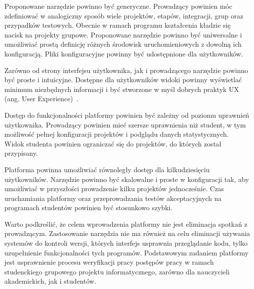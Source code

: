 Proponowane narzędzie powinno być generyczne.
Prowadzący powinien móc zdefiniować w analogiczny sposób wiele projektów, etapów, integracji, grup oraz przypadków testowych.
Obecnie w ramach programu kształcenia kładzie się nacisk na projekty grupowe.
Proponowane narzędzie powinno być uniwersalne i umożliwiać prostą definicję różnych środowisk uruchomieniowych z dowolną ich konfiguracją.
Pliki konfiguracyjne powinny być udostępnione dla użytkowników.

Zarówno od strony interfejsu użytkownika, jak i prowadzącego narzędzie powinno być proste i intuicyjne.
Dostępne dla użytkowników widoki powinny wyświetlać minimum niezbędnych informacji i być stworzone w myśl dobrych praktyk UX (ang. User Experience)~\cite{ux-good-practicies}.

Dostęp do funkcjonalności platformy powinien być zależny od poziomu uprawnień użytkownika.
Prowadzący powinien mieć szersze uprawnienia niż student, w tym możliwość pełnej konfiguracji projektów i podglądu danych statystycznych.
Widok studenta powinien ograniczać się do projektów, do których został przypisany.

Platforma powinna umożliwiać równoległy dostęp dla kilkudziesięciu użytkowników.
Narzędzie powinno być skalowalne i proste w konfiguracji tak, aby umożliwiać w przyszłości prowadzenie kilku projektów jednocześnie.
Czas uruchamiania platformy oraz przeprowadzania testów akceptacyjnych na programach studentów powinien być stosunkowo szybki.
 
Warto podkreślić, że celem wprowadzenia platformy nie jest eliminacja spotkań z prowadzącym.
Zastosowanie narzędzia nie ma również na celu eliminacji używania systemów do kontroli wersji, których interfejs usprawnia przeglądanie kodu, tylko uzupełnienie funkcjonalności tych programów.
Podstawowym zadaniem platformy jest usprawnienie procesu weryfikacji pracy postępów pracy w ramach studenckiego grupowego projektu informatycznego, zarówno dla nauczycieli akademickich, jak i studentów.	
	
